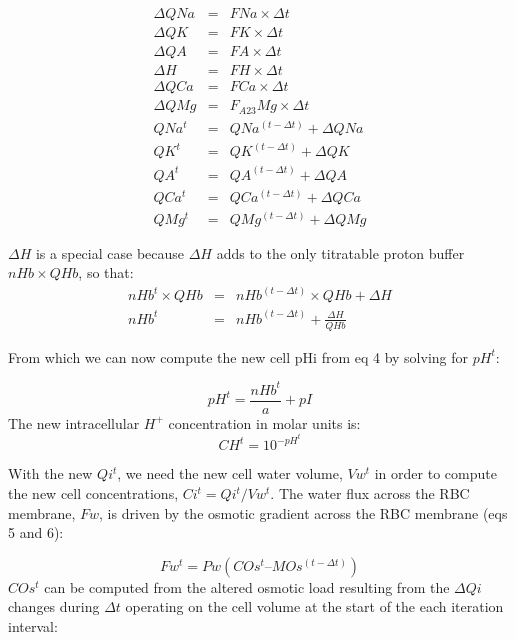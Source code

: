 \documentclass[a4paper]{article}
\newcommand{\med}[1]{M#1}
\newcommand{\cell}[1]{C#1}
\newcommand{\MOs}{\med{Os}}
\newcommand{\COs}{\cell{Os}}
\newcommand{\F}[2]{F_{#1}#2}
\begin{document}
\begin{eqnarray}
\Delta QNa &=& FNa\times\Delta t\\
\Delta QK &=& FK\times\Delta t \\
\Delta QA &=& FA\times\Delta t \\
\Delta H &=& FH\times\Delta t \\
\Delta QCa &=& FCa\times\Delta t \\
\Delta QMg &=& \F{A23}{Mg}\times\Delta t \\
QNa^t &=& QNa^{(t-\Delta t)} + \Delta QNa \\
QK^t &=& QK^{(t-\Delta t)} + \Delta QK  \\
QA^t &=& QA^{(t-\Delta t)} + \Delta QA  \\
QCa^t &=& QCa^{(t-\Delta t)} + \Delta QCa  \\
QMg^t &=& QMg^{(t-\Delta t)} + \Delta QMg
\end{eqnarray}

$\Delta H$ is a special case because $\Delta H$ adds to the only titratable proton buffer $nHb\times QHb$, so that:
\setcounter{equation}{0}
\renewcommand{\theequation}{21\alph{equation}}
\begin{eqnarray}
nHb^t\times QHb &=& nHb^{(t-\Delta t)}\times QHb + \Delta H \\
nHb^t &=& nHb^{(t-\Delta t)}  + \frac{\Delta H}{QHb}
\end{eqnarray}

From which we can now compute the new cell pHi from eq 4 by solving for $pH^t$:

\begin{equation}
pH^t = \frac{nHb^t}{a} + pI
\end{equation}
The new intracellular $H^+$ concentration in molar units is:
\begin{equation}
CH^t = 10^{-pH^t}
\end{equation}

With the new $Qi^t$, we need the new cell water volume, $Vw^t$ in order to compute the new cell concentrations, $Ci^t = Qi^t/Vw^t$.  The water flux across the RBC membrane, $Fw$, is driven by the osmotic gradient across the RBC membrane (eqs 5 and 6): 
\setcounter{equation}{0}
\renewcommand{\theequation}{22\alph{equation}}

\begin{equation}
Fw^t = Pw(\COs^t – \MOs^{(t-\Delta t)}) 
\end{equation}
$\COs^t$ can be computed from the altered osmotic load resulting from the $\Delta Qi$ changes during $\Delta t$ operating on the cell volume at the start of the each iteration interval: 
\end{document}
